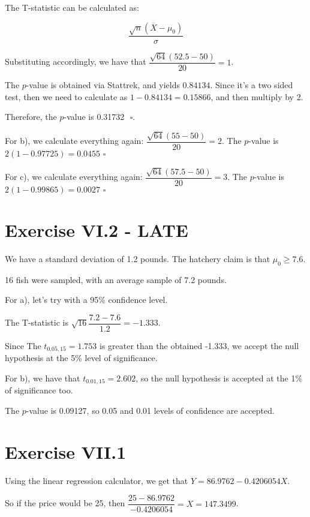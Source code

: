 \documentclass[titlepage, letterpaper]{article}
\newcommand{\qed}{\,\,\square}
\begin{document}
The T-statistic can be calculated as:

$$\frac{\sqrt{n}(\overline{X} - \mu_0)}{\sigma}$$

Substituting accordingly, we have that $\dfrac{\sqrt{64}(52.5 - 50)}{20} = 1$.

The $p$-value is obtained via Stattrek, and yields $0.84134$.
Since it's a two sided test, then we need to calculate as $1 - 0.84134 = 0.15866$, and then multiply by 2.

Therefore, the $p$-value is 0.31732 $\qed$.

For b), we calculate everything again: $\dfrac{\sqrt{64}(55 - 50)}{20} = 2$.
The $p$-value is $2(1 - 0.97725) = 0.0455 \qed$

For c), we calculate everything again: $\dfrac{\sqrt{64}(57.5 - 50)}{20} = 3$.
The $p$-value is $2(1 - 0.99865) = 0.0027 \qed$


\section{Exercise VI.2 - LATE} %
\label{sec:exercise_vi_2}

We have a standard deviation of 1.2 pounds.
The hatchery claim is that $\mu_0 \geq 7.6$.

16 fish were sampled, with an average sample of 7.2 pounds.

For a), let's try with a 95\% confidence level.

The T-statistic is $\sqrt{16} \dfrac{7.2 - 7.6}{1.2} = -1.333$.

Since The $t_{0.05,15} = 1.753$ is greater than the obtained -1.333, we accept the null hypothesis at the 5\% level of significance.

For b), we have that $t_{0.01,15} = 2.602$, so the null hypothesis is accepted at the 1\% of significance too.

The $p$-value is 0.09127, so 0.05 and 0.01 levels of confidence are accepted.

\section{Exercise VII.1} %
\label{sec:exercise_vii_1}

Using the linear regression calculator, we get that $Y = 86.9762 - 0.4206054 X$.

So if the price would be 25, then $\dfrac{25 -86.9762}{- 0.4206054} = X = 147.3499$.
\end{document}
